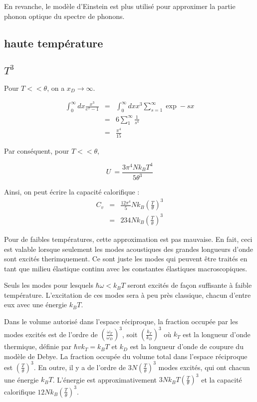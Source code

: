 En revanche, le modèle d'Einstein est plus utilisé pour approximer la partie
phonon optique du spectre de phonons.

\subsection{haute température}

\subsection{$T^3$}

Pour $T<<\theta$, on a $x_D \rightarrow \infty$.

\begin{eqnarray}
    \int_0^\infty dx \frac{x^3}{e^x-1} & = & \int_0^\infty dx x^3 \sum_{s=1}^{\infty} \exp -sx\\
    & = & 6 \sum_1^\infty \frac{1}{s^4}\\
    & = & \frac{\pi^4}{15}
\end{eqnarray}

Par conséquent, pour $T<<\theta$,

\begin{equation}
    U ~= \frac{3 \pi^4 N k_B T^4}{5 \theta^3}
\end{equation}

Ainsi, on peut écrire la capacité calorifique :
\begin{eqnarray}
    C_v & = & \frac{12\pi^4}{5} N k_B \left( \frac{T}{\theta}\right)^3 \\
    & = & 234 N k_B \left( \frac{T}{\theta} \right) ^3
\end{eqnarray}

Pour de faibles températures, cette approximation est pas mauvaise. En fait,
ceci est valable lorsque seulement les modes acoustiques des grandes longueurs
d'onde sont excités therimquement. Ce sont juste les modes qui peuvent être
traités en tant que milieu élastique continu avec les constantes élastiques
macroscopiques.

Seuls les modes pour lesquels $\hbar \omega < k_B T$ seront excités de façon
suffisante à faible température. L'excitation de ces modes sera à peu près
classique, chacun d'entre eux avec une énergie $k_BT$.

Dans le volume autorisé dans l'espace réciproque, la fraction occupée par les
modes excités est de l'ordre de
$\left( \frac{\omega_T}{\omega_D} \right)^3$, soit
$\left( \frac{k_T}{k_D} \right)^3$ où $k_T$ est la longueur d'onde thermique,
définie par $\hbar v k_T = k_B T$ et $k_D$ est la longueur d'onde de coupure
du modèle de Debye.
La fraction occupée du volume total dans l'espace réciproque est
$\left( \frac{T}{\theta} \right)^3$. En outre, il y a de l'ordre de
$3N \left( \frac{T}{\theta} \right)^3$ modes excités, qui ont chacun une énergie
$k_B T$. L'énergie est approximativement
$3Nk_B T \left( \frac{T}{\theta} \right)^3$ et la capacité calorifique
$12Nk_B \left( \frac{T}{\theta} \right)^3$.

